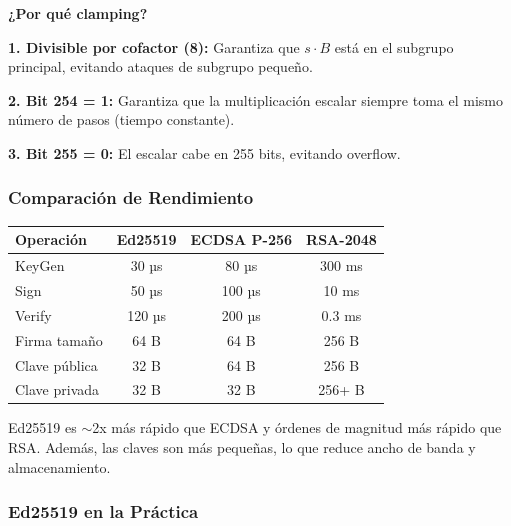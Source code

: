 \documentclass[11pt,a4paper,twoside,openright]{book}
\theoremstyle{definition}
\theoremstyle{plain}
\theoremstyle{remark}
\begin{document}
\begin{mathnote}
\textbf{¿Por qué clamping?}

\textbf{1. Divisible por cofactor (8):}
Garantiza que $s \cdot B$ está en el subgrupo principal, evitando ataques de subgrupo pequeño.

\textbf{2. Bit 254 = 1:}
Garantiza que la multiplicación escalar siempre toma el mismo número de pasos (tiempo constante).

\textbf{3. Bit 255 = 0:}
El escalar cabe en 255 bits, evitando overflow.
\end{mathnote}

\subsubsection{Comparación de Rendimiento}

\begin{center}
\begin{tabular}{lccc}
\toprule
\textbf{Operación} & \textbf{Ed25519} & \textbf{ECDSA P-256} & \textbf{RSA-2048} \\
\midrule
KeyGen & 30 µs & 80 µs & 300 ms \\
Sign & 50 µs & 100 µs & 10 ms \\
Verify & 120 µs & 200 µs & 0.3 ms \\
Firma tamaño & 64 B & 64 B & 256 B \\
Clave pública & 32 B & 64 B & 256 B \\
Clave privada & 32 B & 32 B & 256+ B \\
\bottomrule
\end{tabular}
\end{center}

\begin{intuicion}
Ed25519 es $\sim$2x más rápido que ECDSA y órdenes de magnitud más rápido que RSA. Además, las claves son más pequeñas, lo que reduce ancho de banda y almacenamiento.
\end{intuicion}

\subsubsection{Ed25519 en la Práctica}
\end{document}
